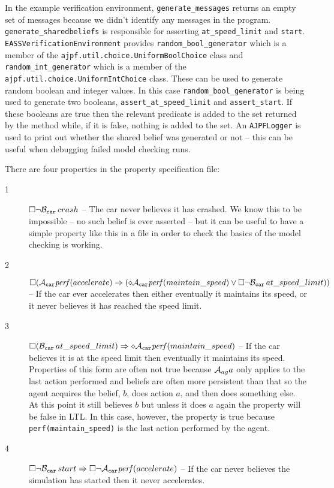 In the example verification environment, \texttt{generate\_messages} returns an empty set of messages because we didn't identify any messages in the program.  \texttt{generate\_sharedbeliefs} is responsible for asserting \lstinline{at_speed_limit} and \lstinline{start}.  \texttt{EASSVerificationEnvironment} provides \texttt{random\_bool\_generator} which is a member of the \texttt{ajpf.util.choice.UniformBoolChoice} class and \texttt{random\_int\_generator} which is a member of the \texttt{ajpf.util.choice.UniformIntChoice} class.  These can be used to generate random boolean and integer values.  In this case \texttt{random\_bool\_generator} is being used to generate two booleans, \texttt{assert\_at\_speed\_limit} and \texttt{assert\_start}.  If these booleans are true then the relevant predicate is added to the set returned by the method while, if it is false, nothing is added to the set.  An \texttt{AJPFLogger} is used to print out whether the shared belief was generated or not -- this can be useful when debugging failed model checking runs.

There are four properties in the property specification file:
\begin{description}
\item[1] $\Box \neg \mathrm{{\cal B}}_{\texttt{car}} \, crash$ -- The car never believes it has crashed.  We know this to be impossible -- no such belief is ever asserted -- but it can be useful to have a simple property like this in a file in order to check the basics of the model checking is working.
\item[2] $\Box ( \mathrm{{\cal A}}_{\texttt{car}} \mathit{perf}(accelerate) \Rightarrow (\diamond \mathrm{{\cal A}}_{\texttt{car}} \mathit{perf}(maintain\_speed) \lor \Box  \neg \mathrm{{\cal B}}_{\texttt{car}} \, at\_speed\_limit))$ -- If the car ever accelerates then either eventually it maintains its speed, or it never believes it has reached the speed limit.
\item[3] $\Box ( \mathrm{{\cal B}}_{\texttt{car}} \, at\_speed\_limit) \Rightarrow \diamond \mathrm{{\cal A}}_{\texttt{car}} \mathit{perf}(maintain\_speed)$ -- If the car believes it is at the speed limit then eventually it maintains its speed.  Properties of this form are often not true because $\mathrm{{\cal A}}_{ag} a$ only applies to the last action performed and beliefs are often more persistent than that so the agent acquires the belief, $b$, does action $a$, and then does something else.  At this point it still believes $b$ but unless it does $a$ again the property will be false in LTL.  In this case, however, the property is true because \lstinline{perf(maintain_speed)} is the last action performed by the agent.
\item[4] $\Box \neg \mathrm{{\cal B}}_{\texttt{car}} \, start \Rightarrow \Box \neg \mathrm{{\cal A}}_{\texttt{car}} \mathit{perf}(accelerate)$ -- If the car never believes the simulation has started then it never accelerates.
\end{description}  

